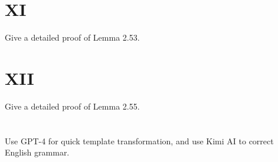\documentclass[a4paper]{article}
\begin{document}
\section*{XI}
Give a detailed proof of Lemma 2.53.

\section*{XII}
Give a detailed proof of Lemma 2.55.






\section*{  }
Use GPT-4 for quick template transformation, and use Kimi AI to correct English grammar.
\end{document}
